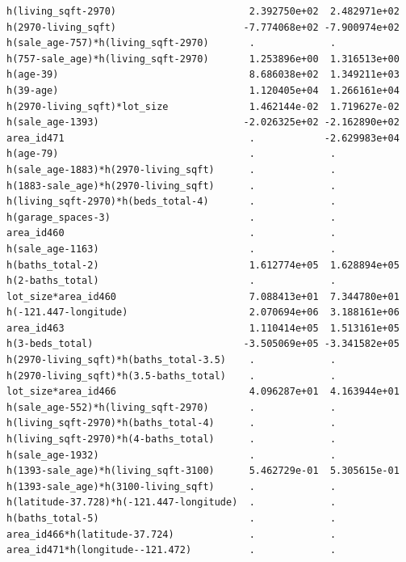 \documentclass[
]{article}
\begin{document}
\begin{verbatim}
h(living_sqft-2970)                       2.392750e+02  2.482971e+02
h(2970-living_sqft)                      -7.774068e+02 -7.900974e+02
h(sale_age-757)*h(living_sqft-2970)       .             .           
h(757-sale_age)*h(living_sqft-2970)       1.253896e+00  1.316513e+00
h(age-39)                                 8.686038e+02  1.349211e+03
h(39-age)                                 1.120405e+04  1.266161e+04
h(2970-living_sqft)*lot_size              1.462144e-02  1.719627e-02
h(sale_age-1393)                         -2.026325e+02 -2.162890e+02
area_id471                                .            -2.629983e+04
h(age-79)                                 .             .           
h(sale_age-1883)*h(2970-living_sqft)      .             .           
h(1883-sale_age)*h(2970-living_sqft)      .             .           
h(living_sqft-2970)*h(beds_total-4)       .             .           
h(garage_spaces-3)                        .             .           
area_id460                                .             .           
h(sale_age-1163)                          .             .           
h(baths_total-2)                          1.612774e+05  1.628894e+05
h(2-baths_total)                          .             .           
lot_size*area_id460                       7.088413e+01  7.344780e+01
h(-121.447-longitude)                     2.070694e+06  3.188161e+06
area_id463                                1.110414e+05  1.513161e+05
h(3-beds_total)                          -3.505069e+05 -3.341582e+05
h(2970-living_sqft)*h(baths_total-3.5)    .             .           
h(2970-living_sqft)*h(3.5-baths_total)    .             .           
lot_size*area_id466                       4.096287e+01  4.163944e+01
h(sale_age-552)*h(living_sqft-2970)       .             .           
h(living_sqft-2970)*h(baths_total-4)      .             .           
h(living_sqft-2970)*h(4-baths_total)      .             .           
h(sale_age-1932)                          .             .           
h(1393-sale_age)*h(living_sqft-3100)      5.462729e-01  5.305615e-01
h(1393-sale_age)*h(3100-living_sqft)      .             .           
h(latitude-37.728)*h(-121.447-longitude)  .             .           
h(baths_total-5)                          .             .           
area_id466*h(latitude-37.724)             .             .           
area_id471*h(longitude--121.472)          .             .           
                                                                    

\end{verbatim}
\end{document}

